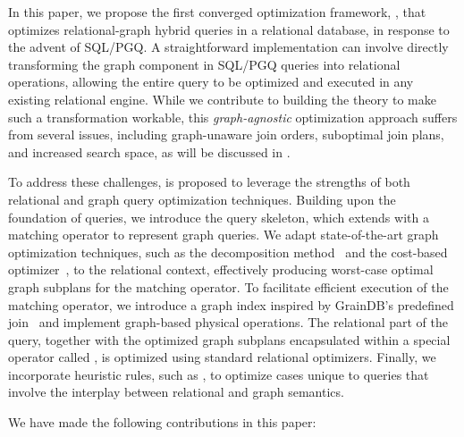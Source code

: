 In this paper, we propose the first converged optimization framework, \name, that optimizes relational-graph hybrid queries in a relational database, in response to the advent of SQL/PGQ. A straightforward implementation can involve directly transforming the graph component in SQL/PGQ queries into relational operations, allowing the entire query to be optimized and executed in any existing relational engine. While we contribute to building the theory to make such a transformation workable, this \emph{graph-agnostic} optimization approach suffers from several issues, including graph-unaware join orders, suboptimal join plans, and increased search space, as will be discussed in .

To address these challenges, \name is proposed to leverage the strengths of both relational and graph query optimization techniques. Building upon the foundation of \spj queries, we introduce the \spjm query skeleton, which extends \spj with a matching operator to represent graph queries. We adapt state-of-the-art graph optimization techniques, such as the decomposition method~\cite{huge} and the cost-based optimizer~\cite{GLogS}, to the relational context, effectively producing worst-case optimal graph subplans for the matching operator. To facilitate efficient execution of the matching operator, we introduce a graph index inspired by GrainDB's predefined join~\cite{graindb} and implement graph-based physical operations. The relational part of the query, together with the optimized graph subplans encapsulated within a special operator called \scangraphtable, is optimized using standard relational optimizers. Finally, we incorporate heuristic rules, such as \filterrule, to optimize cases unique to \spjm queries that involve the interplay between relational and graph semantics.

We have made the following contributions in this paper:


